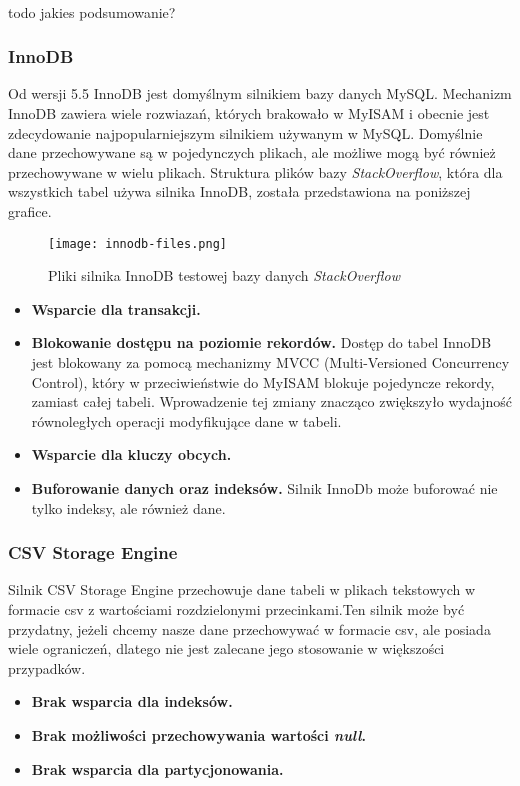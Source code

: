 \\todo jakies podsumowanie?

\subsubsection{InnoDB}
Od wersji 5.5 InnoDB jest domyślnym silnikiem bazy danych MySQL. Mechanizm InnoDB zawiera wiele rozwiazań, których brakowało w MyISAM i obecnie jest zdecydowanie najpopularniejszym silnikiem używanym w MySQL. Domyślnie dane przechowywane są w pojedynczych plikach, ale możliwe mogą być również przechowywane w wielu plikach. Struktura plików bazy \textit{StackOverflow}, która dla wszystkich tabel używa silnika InnoDB, została przedstawiona na poniższej grafice. 
\begin{figure}[!h]
	\caption{Pliki silnika InnoDB testowej bazy danych \textit{StackOverflow}}
	\centering
	\texttt{[image: innodb-files.png]}
	\label{fig:label}
\end{figure}

\begin{itemize}
	\item \textbf{Wsparcie dla transakcji. }
	\item \textbf{Blokowanie dostępu na poziomie rekordów. } Dostęp do tabel InnoDB jest blokowany za pomocą mechanizmy MVCC (Multi-Versioned Concurrency Control), który w przeciwieństwie do MyISAM blokuje pojedyncze rekordy, zamiast całej tabeli. Wprowadzenie tej zmiany znacząco zwiększyło wydajność równoległych operacji modyfikujące dane w tabeli.
	\item \textbf{Wsparcie dla kluczy obcych.}
	\item \textbf{Buforowanie danych oraz indeksów.} Silnik InnoDb może buforować nie tylko indeksy, ale również dane.
\end{itemize}

\subsubsection{CSV Storage Engine}
Silnik CSV Storage Engine przechowuje dane tabeli w plikach tekstowych w formacie csv z wartościami rozdzielonymi przecinkami.Ten silnik może być przydatny, jeżeli chcemy nasze dane przechowywać w formacie csv, ale posiada wiele ograniczeń, dlatego nie jest zalecane jego stosowanie w większości przypadków.

\begin{itemize}
	\item \textbf{Brak wsparcia dla indeksów.}
	\item \textbf{Brak możliwości przechowywania wartości \textit{null}.}
	\item \textbf{Brak wsparcia dla partycjonowania.}
\end{itemize}

